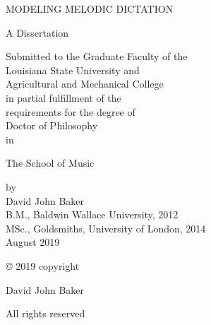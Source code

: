 \thispagestyle{empty}
\begin{center}
MODELING MELODIC DICTATION\\
\end{center}

\begin{center}
A Dissertation

Submitted to the Graduate Faculty of the\\
Louisiana State University and\\
Agricultural and Mechanical College\\
in partial fulfillment of the\\
requirements for the degree of\\
Doctor of Philosophy\\

in

The School of Music
\end{center}

\begin{center}
by\\
David John Baker\\
B.M., Baldwin Wallace University, 2012\\
MSc., Goldsmiths, University of London, 2014\\
August 2019\\
\end{center}


\setlength{\abovedisplayskip}{-5pt}
\setlength{\abovedisplayshortskip}{-5pt}


\newpage

\thispagestyle{plain}

© 2019 copyright

David John Baker

All rights reserved


\let\cleardoublepage\clearpage


